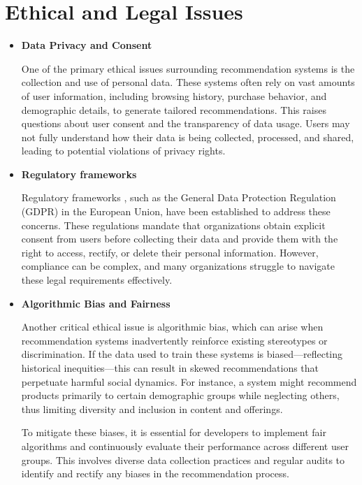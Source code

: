 \documentclass[10pt,twoside,slovak,a4paper]{article}
\begin{document}
\section{Ethical and Legal Issues} \label{Ethical and Legal Issues}
\begin{itemize}



\item \textbf{Data Privacy and Consent} 

One of the primary ethical issues surrounding recommendation systems is the collection and use of personal data\cite{problems}. These systems often rely on vast amounts of user information, including browsing history, purchase behavior, and demographic details, to generate tailored recommendations. This raises questions about user consent and the transparency of data usage. Users may not fully understand how their data is being collected, processed, and shared, leading to potential violations of privacy rights.

\item \textbf{Regulatory frameworks}

Regulatory frameworks , such as the General Data Protection Regulation (GDPR) in the European Union, have been established to address these concerns. These regulations mandate that organizations obtain explicit consent from users before collecting their data and provide them with the right to access, rectify, or delete their personal information\cite{ethical}. However, compliance can be complex, and many organizations struggle to navigate these legal requirements effectively.

\newpage
\item \textbf{Algorithmic Bias and Fairness} 

Another critical ethical issue is algorithmic bias\cite{problems}, which can arise when recommendation systems inadvertently reinforce existing stereotypes or discrimination. If the data used to train these systems is biased—reflecting historical inequities—this can result in skewed recommendations that perpetuate harmful social dynamics. For instance, a system might recommend products primarily to certain demographic groups while neglecting others, thus limiting diversity and inclusion in content and offerings.

To mitigate these biases, it is essential for developers to implement fair algorithms and continuously evaluate their performance across different user groups. This involves diverse data collection practices and regular audits to identify and rectify any biases in the recommendation process.


\end{itemize}
\end{document}
